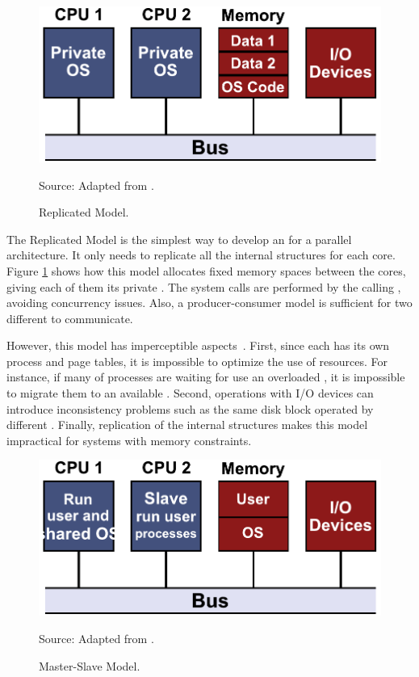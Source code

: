 			\begin{figure}[t]
				\centering
				\caption{Replicated \os Model.}

				\includegraphics[width=.7\textwidth]{images/replicated-os.pdf}

				Source: Adapted from \cite{tanenbaum:4ed}.

				\label{fig.replicated-os}
			\end{figure}

			The Replicated Model is the simplest way to develop an \os for a
			parallel architecture.
			It only needs to replicate all the internal \os structures for each core.
			Figure \ref{fig.replicated-os} shows how this model allocates fixed memory spaces
			between the cores, giving each of them its private \os.
			The system calls are performed by the calling \cpu, avoiding concurrency issues.
			Also, a producer-consumer model is sufficient for two different \cpus to communicate.

			However, this model has imperceptible aspects~\cite{tanenbaum:4ed}.
			First, since each \cpu has its own process and page tables, it is impossible
			to optimize the use of resources.
			For instance, if many of processes are waiting for use an overloaded \cpu,
			it is impossible to migrate them to an available \cpu.
			Second, operations with I/O devices can introduce inconsistency problems
			such as the same disk block operated by different \cpus.
			Finally, replication of the internal \os structures makes this model
			impractical for systems with memory constraints.

			\begin{figure}[t]
				\centering
				\caption{Master-Slave \os Model.}

				\includegraphics[width=.7\textwidth]{images/master-slave-os.pdf}

				Source: Adapted from \cite{tanenbaum:4ed}.

				\label{fig.master-slave-os}
			\end{figure}


